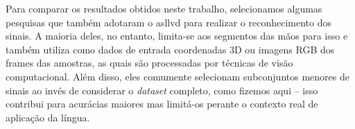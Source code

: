 




Para comparar os resultados obtidos neste trabalho, selecionamos algumas pesquisas que também adotaram o \acrshort{asllvd} para realizar o reconhecimento dos sinais.
A maioria deles, no entanto, limita-se aos segmentos das mãos para isso e também utiliza como dados de entrada coordenadas 3D ou imagens RGB dos frames das amostras, as quais são processadas por técnicas de visão computacional.
Além disso, eles comumente selecionam subconjuntos menores de sinais ao invés de considerar o \textit{dataset} completo, como fizemos aqui -- isso contribui para acurácias maiores mas limitá-os perante o contexto real de aplicação da língua.


